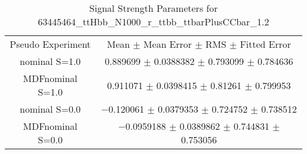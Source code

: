 \begin{table}
\centering
\caption{Signal Strength Parameters for 63445464\_ttHbb\_N1000\_r\_ttbb\_ttbarPlusCCbar\_1.2}
\begin{tabular}{cc}
\toprule
Pseudo Experiment & Mean $\pm$ Mean Error $\pm$ RMS $\pm$ Fitted Error\\
nominal S=1.0 & \num{0.889699} $\pm$ \num{0.0388382} $\pm$ \num{0.793099} $\pm$ \num{0.784636}\\
MDFnominal S=1.0 & \num{0.911071} $\pm$ \num{0.0398415} $\pm$ \num{0.81261} $\pm$ \num{0.799953}\\
nominal S=0.0 & \num{-0.120061} $\pm$ \num{0.0379353} $\pm$ \num{0.724752} $\pm$ \num{0.738512}\\
MDFnominal S=0.0 & \num{-0.0959188} $\pm$ \num{0.0389862} $\pm$ \num{0.744831} $\pm$ \num{0.753056}\\
\bottomrule
\end{tabular}
\end{table}